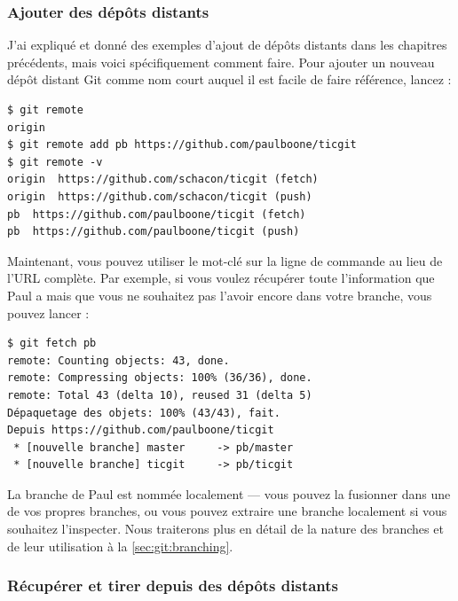 \subsubsection{Ajouter des dépôts distants}

J'ai expliqué et donné des exemples d'ajout de dépôts distants dans les chapitres précédents, mais voici spécifiquement comment faire.
Pour ajouter un nouveau dépôt distant Git comme nom court auquel il est facile de faire référence, lancez :
\begin{Schunk}
\begin{Verbatim}
$ git remote
origin
$ git remote add pb https://github.com/paulboone/ticgit
$ git remote -v
origin	https://github.com/schacon/ticgit (fetch)
origin	https://github.com/schacon/ticgit (push)
pb	https://github.com/paulboone/ticgit (fetch)
pb	https://github.com/paulboone/ticgit (push)
\end{Verbatim}
\end{Schunk}

Maintenant, vous pouvez utiliser le mot-clé  sur la ligne de commande au lieu de l'URL complète.
Par exemple, si vous voulez récupérer toute l'information que Paul a mais que vous ne souhaitez pas l'avoir encore dans votre branche, vous pouvez lancer :
\begin{Schunk}
\begin{Verbatim}
$ git fetch pb
remote: Counting objects: 43, done.
remote: Compressing objects: 100% (36/36), done.
remote: Total 43 (delta 10), reused 31 (delta 5)
Dépaquetage des objets: 100% (43/43), fait.
Depuis https://github.com/paulboone/ticgit
 * [nouvelle branche] master     -> pb/master
 * [nouvelle branche] ticgit     -> pb/ticgit
\end{Verbatim}
\end{Schunk}

La branche  de Paul est nommée localement  --- vous pouvez la fusionner dans une de vos propres branches, ou vous pouvez extraire une branche localement si vous souhaitez l'inspecter. Nous traiterons plus en détail de la nature des branches et de leur utilisation à la \autoref{sec:git:branching}.

\subsubsection{Récupérer et tirer depuis des dépôts distants}
\label{sec:git:fetching_and_pulling}

